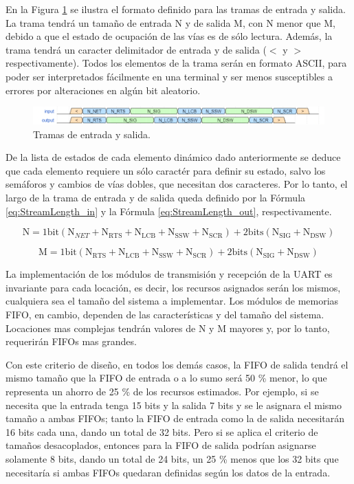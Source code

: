 	En la Figura \ref{fig:Stream} se ilustra el formato definido para las tramas de entrada y salida. La trama tendrá un tamaño de entrada N y de salida M, con N menor que M, debido a que el estado de ocupación de las vías es de sólo lectura. Además, la trama tendrá un caracter delimitador de entrada y de salida ($<$ y $>$ respectivamente). Todos los elementos de la trama serán en formato ASCII, para poder ser interpretados fácilmente en una terminal y ser menos susceptibles a errores por alteraciones en algún bit aleatorio.
	
	\begin{figure}[H]
		\centering
		\includegraphics[width=1\textwidth]{Figuras/Tramas.png}
		\centering\caption{Tramas de entrada y salida.}
		\label{fig:Stream}
	\end{figure}
	
	De la lista de estados de cada elemento dinámico dado anteriormente se deduce que cada elemento requiere un sólo caractér para definir su estado, salvo los semáforos y cambios de vías dobles, que necesitan dos caracteres. Por lo tanto, el largo de la trama de entrada y de salida queda definido por la Fórmula \ref{eq:StreamLength_in} y la Fórmula \ref{eq:StreamLength_out}, respectivamente.
	
	\begin{equation} 
		\label{eq:StreamLength_in}
		\text{N} = 1\text{bit} (\text{N}_{NET}+\text{N}_{\text{RTS}}+\text{N}_{\text{LCB}}+\text{N}_{\text{SSW}}+\text{N}_{\text{SCR}})+2\text{bits} (\text{N}_{\text{SIG}}+\text{N}_{\text{DSW}})
	\end{equation}
	
	\begin{equation} 
		\label{eq:StreamLength_out}
		\text{M} = 1\text{bit} (\text{N}_{\text{RTS}}+\text{N}_{\text{LCB}}+\text{N}_{\text{SSW}}+\text{N}_{\text{SCR}})+2\text{bits} (\text{N}_{\text{SIG}}+\text{N}_{\text{DSW}})
	\end{equation}
	
	La implementación de los módulos de transmisión y recepción de la UART es invariante para cada locación, es decir, los recursos asignados serán los mismos, cualquiera sea el tamaño del sistema a implementar. Los módulos de memorias FIFO, en cambio, dependen de las características y del tamaño del sistema. Locaciones mas complejas tendrán valores de N y M mayores y, por lo tanto, requerirán FIFOs mas grandes. 
	
	Con este criterio de diseño, en todos los demás casos, la FIFO de salida tendrá el mismo tamaño que la FIFO de entrada o a lo sumo será 50 \% menor, lo que representa un ahorro de 25 \% de los recursos estimados. Por ejemplo, si se necesita que la entrada tenga 15 bits y la salida 7 bits y se le asignara el mismo tamaño a ambas FIFOs; tanto la FIFO de entrada como la de salida necesitarán 16 bits cada una, dando un total de 32 bits. Pero si se aplica el criterio de tamaños desacoplados, entonces para la FIFO de salida podrían asignarse solamente 8 bits,
	dando un total de 24 bits, un 25 \% menos que los 32 bits que necesitaría si ambas FIFOs quedaran definidas según los datos de la entrada.